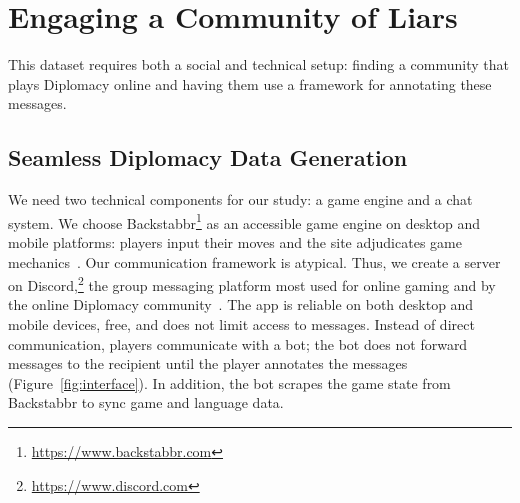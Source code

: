 \section{Engaging a Community of Liars}
\label{sec:study}

This dataset requires both a social and technical setup: finding a
community that plays Diplomacy online and having them use a
framework for annotating these messages.

\subsection{Seamless Diplomacy Data Generation}
\label{sec:interface}


We need two technical components for our study: a game engine and a
chat system.
We choose Backstabbr\footnote{\url{https://www.backstabbr.com}} as an
accessible game engine on desktop and mobile platforms: players input
their moves and the site adjudicates game
mechanics~\citep{chiodini2020backstabbr}.
%
Our communication framework is atypical.
%
Thus, we create a server on Discord,\footnote{\url{https://www.discord.com}}
the group messaging platform most used for online gaming and by the
online Diplomacy community~\citep{techspot}.
%
The app is reliable on both desktop and mobile devices, free, and does
not limit access to messages.
%
Instead of direct communication, players communicate with a bot;
the bot does not forward messages to the recipient until the player
annotates the messages (Figure~\ref{fig:interface}).
%
In addition, the bot scrapes the game state from Backstabbr to sync
game and language data.




